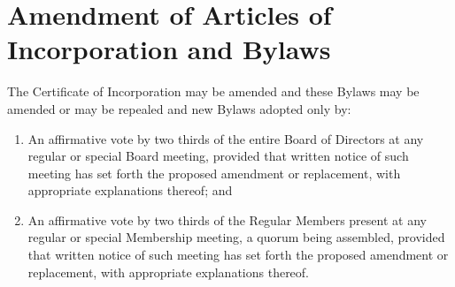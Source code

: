 \section{Amendment of Articles of Incorporation and Bylaws}
\noindent
The Certificate of Incorporation may be amended and these Bylaws may
be amended or may be repealed and new Bylaws adopted only by:
\begin{enumerate}
  \item An affirmative vote by two thirds of the entire Board of
    Directors at any regular or special Board meeting, provided that
    written notice of such meeting has set forth the proposed
    amendment or replacement, with appropriate explanations thereof;
    and
  \item An affirmative vote by two thirds of the Regular Members
    present at any regular or special Membership meeting, a quorum
    being assembled, provided that written notice of such meeting has
    set forth the proposed amendment or replacement, with appropriate
    explanations thereof.
\end{enumerate}

